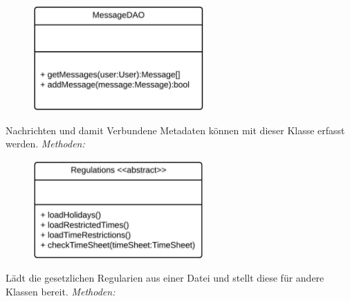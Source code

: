 \begin{itemize}
                \begin{figure}[htb]
                \centering
                \includegraphics[width=6.5cm]{Diagramms/class/singleclass/MessageDao.pdf}
                \end{figure}
                \newline
                Nachrichten und damit Verbundene Metadaten können mit dieser Klasse erfasst werden.
                \emph{Methoden:}
                \begin{itemize}
                \end{itemize}

            \newpage
                \begin{figure}[htb]
                \centering
                \includegraphics[width=6.5cm]{Diagramms/class/singleclass/Reg.pdf}
                \end{figure}
                \newline
                Lädt die gesetzlichen Regularien aus einer Datei und stellt diese für andere Klassen bereit.
                \emph{Methoden:}
                \begin{itemize}
                \end{itemize}


\end{itemize}

